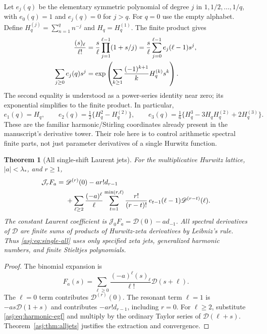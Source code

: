 \documentclass[11pt]{article}
\numberwithin{equation}{section}
\newtheorem{theorem}{Theorem}[section]
\theoremstyle{definition}\newtheorem{definition}[theorem]{Definition}
\theoremstyle{remark}\newtheorem{remark}[theorem]{Remark}\newtheorem{example}[theorem]{Example}
\newcommand{\D}{\mathscr D}\newcommand{\calH}{\mathcal H}\newcommand{\calR}{\mathcal R}
\newcommand{\calJ}{\mathcal J}\newcommand{\calZ}{\mathcal Z}
\begin{document}
Let $e_j(q)$ be the elementary symmetric polynomial of degree $j$ in
$1,1/2,\ldots,1/q$, with $e_0(q)=1$ and $e_j(q)=0$ for $j>q$.
For $q=0$ use the empty alphabet. Define
$H_q^{(j)}=\sum_{n=1}^q n^{-j}$ and $H_q=H_q^{(1)}$.
The finite product gives
\begin{align}\label{asj:eq:harmonic-egf}
 \frac{(s)_\ell}{\ell!}
 &=\frac{s}{\ell}\prod_{j=1}^{\ell-1}(1+s/j)
   =\frac{s}{\ell}\sum_{j=0}^{\ell-1}e_j(\ell-1)s^j,\notag\\
 \sum_{j\ge0}e_j(q)s^j
 &=\exp\left(\sum_{k\ge1}\frac{(-1)^{k+1}}kH_q^{(k)}s^k\right).
\end{align}
The second equality is understood as a power-series identity near zero;
its exponential simplifies to the finite product. In particular,
\[
 e_1(q)=H_q,\qquad
 e_2(q)=\tfrac12\{H_q^2-H_q^{(2)}\},\qquad
 e_3(q)=\tfrac16\{H_q^3-3H_qH_q^{(2)}+2H_q^{(3)}\}.
\]
These are the familiar harmonic/Stirling coordinates already present in
the manuscript's derivative tower. Their role here is to control
arithmetic spectral finite parts, not just parameter derivatives of a
single Hurwitz function.

\begin{theorem}[All single-shift Laurent jets]\label{asj:thm:harmonic}
For the multiplicative Hurwitz lattice, $|a|<\lambda_*$, and $r\ge1$,
\begin{align}\label{asj:eq:single-all}
 \calJ_r F_a
  ={}&\D^{(r)}(0)-a r!d_{r-1}\notag\\
   &+\sum_{\ell\ge2}\frac{(-a)^\ell}{\ell}
       \sum_{t=1}^{\min(r,\ell)}
         \frac{r!}{(r-t)!}\,e_{t-1}(\ell-1)
                                  \D^{(r-t)}(\ell).
\end{align}
The constant Laurent coefficient is
$\calJ_0F_a=\D(0)-a d_{-1}$. All spectral derivatives of $\D$
are finite sums of products of Hurwitz-zeta derivatives by Leibniz's
rule. Thus \eqref{asj:eq:single-all} uses only specified zeta jets,
generalized harmonic numbers, and finite Stieltjes polynomials.
\end{theorem}
\begin{proof}
The binomial expansion is
\[
 F_a(s)=\sum_{\ell\ge0}\frac{(-a)^\ell(s)_\ell}{\ell!}\D(s+\ell).
\]
The $\ell=0$ term contributes $\D^{(r)}(0)$. The resonant term $\ell=1$
is $-as\D(1+s)$ and contributes $-a r!d_{r-1}$, including $r=0$.
For $\ell\ge2$, substitute \eqref{asj:eq:harmonic-egf} and multiply by
the ordinary Taylor series of $\D(\ell+s)$. Theorem~\ref{asj:thm:alljets}
justifies the extraction and convergence.
\end{proof}
\end{document}
